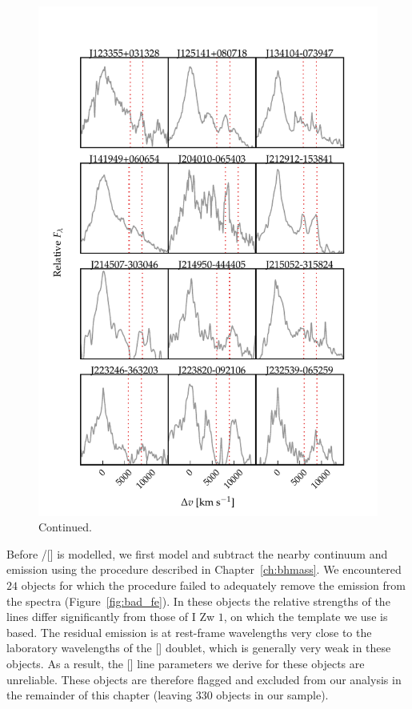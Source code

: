 \begin{figure}
\ContinuedFloat
    \centering
    \includegraphics[width=\columnwidth]{figures/chapter04/example_spectrum_grid_extreme_fe_2.pdf} 
    \caption[]{Continued.}     
\end{figure}

Before \hbns/[] is modelled, we first model and subtract the nearby continuum and  emission using the procedure described in Chapter~\ref{ch:bhmass}. 
We encountered $24$ objects for which the procedure failed to adequately remove the  emission from the spectra (Figure~\ref{fig:bad_fe}).  
In these objects the relative strengths of the  lines differ significantly from those of I Zw $1$, on which the \citet{boroson92}  template we use is based. 
The residual  emission is at rest-frame wavelengths very close to the laboratory wavelengths of the [] doublet, which is generally very weak in these objects. 
As a result, the [] line parameters we derive for these objects are unreliable. 
These objects are therefore flagged and excluded from our analysis in the remainder of this chapter (leaving $330$ objects in our sample). 

